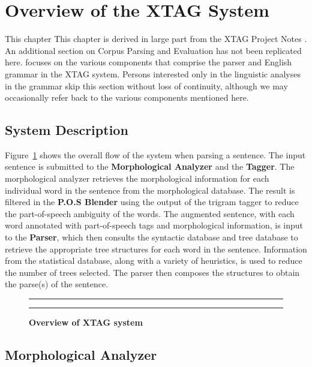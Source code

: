 \section{Overview of the XTAG System}

This chapter {This chapter is derived in large part from the XTAG Project Notes
\cite{Xtag-notes}.  An additional section on Corpus Parsing and Evaluation has
not been replicated here.} focuses on the various components that comprise the
parser and English grammar in the XTAG system.  Persons interested only in the
linguistic analyses in the grammar skip this section without loss of
continuity, although we may occasionally refer back to the various components
mentioned here.

\subsection{System Description}

Figure~{\ref{flowchart}} shows the overall flow of the system when parsing a
sentence. The input sentence is submitted to the {\bf Morphological Analyzer}
and the {\bf Tagger}. The morphological analyzer retrieves the morphological
information for each individual word in the sentence from the morphological
database. The result is filtered in the {\bf P.O.S Blender} using the output of
the trigram tagger to reduce the part-of-speech ambiguity of the words. The
augmented sentence, with each word annotated with part-of-speech tags and
morphological information, is input to the {\bf Parser}, which then consults
the syntactic database and tree database to retrieve the appropriate tree
structures for each word in the sentence.  Information from the statistical
database, along with a variety of heuristics, is used to reduce the number of
trees selected. The parser then composes the structures to obtain the parse(s)
of the sentence.

\begin{figure}[ht]
\centering
\rule[.1in]{4.0in}{0.01in}
{}
\caption{\bf{Overview of XTAG system }}
\rule[.1in]{4.0in}{0.01in}
\label{flowchart}
\end{figure}

\subsection{Morphological Analyzer}

